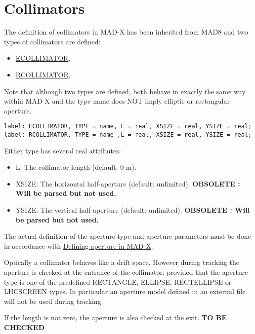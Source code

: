 
\section{Collimators}
 
The definition of collimators in MAD-X has been inherited from MAD8 and two types of collimators are defined: 
\begin{itemize}
   \item \href{ecol}{ECOLLIMATOR}. 
   \item \href{rcol}{RCOLLIMATOR}. 
\end{itemize}  
Note that although two types are defined, both behave in exactly the
same way within MAD-X and the type name does NOT imply elliptic or
rectangular aperture.    

\begin{verbatim}
label: ECOLLIMATOR, TYPE = name, L = real, XSIZE = real, YSIZE = real;
label: RCOLLIMATOR, TYPE = name ,L = real, XSIZE = real, YSIZE = real;
\end{verbatim}  

Either type has several real attributes: 
\begin{itemize}
   \item L: The collimator length (default: 0 m). 
   \item XSIZE: The horizontal half-aperture (default:
     unlimited). \textbf{OBSOLETE : Will be parsed but not used.} 
   \item YSIZE: The vertical half-aperture (default:
     unlimited). \textbf{OBSOLETE : Will be parsed but not used.} 
\end{itemize}  

The actual definition of the aperture type and aperture parameters must
be done in accordance with \href{aperture.html}{Defining aperture in
  MAD-X}.   

Optically a collimator behaves like a drift space.  However during
tracking the aperture is checked at the entrance of the collimator,
provided that the aperture type is one of the predefined RECTANGLE,
ELLIPSE, RECTELLIPSE or LHCSCREEN types.  In particular an aperture
model defined in an external file will not be used during tracking.  

If the length is not zero, the aperture is also checked at the
exit. \textbf{ TO BE CHECKED } 

